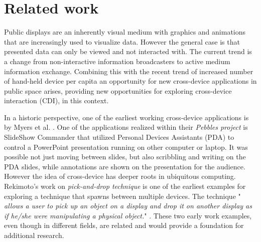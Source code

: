 \section{Related work} \label{sec:relatedwork}

Public displays are an inherently visual medium with graphics and animations that are increasingly used to visualize data. However the general case is that presented data can only be viewed and not interacted with. The current trend is a change from non-interactive information broadcasters to active medium information exchange. Combining this with the recent trend of increased number of hand-held device per capita an opportunity for new cross-device applications in public space arises, providing new opportunities for exploring cross-device interaction (CDI), in this context.

In a historic perspective, one of the earliest working cross-device applications is by Myers et al. \cite{Myers:2001}. 
One of the applications realized within their \emph{Pebbles project} is SlideShow Commander that utilized Personal Devices Assistants (PDA) to control a PowerPoint presentation running on other computer or laptop.
It was possible not just moving between slides, but also scribbling and writing on the PDA slides, while annotations are shown on the presentation for the audience. 
However the idea of cross-device has deeper roots in ubiquitous computing. Rekimoto's work on \emph{pick-and-drop technique} is one of the earliest examples for exploring a technique that spawns between multiple devices. The technique " \emph{allows a user to pick up an object on a display and drop it on another display as if he/she were manipulating a physical object.}" \cite{Rekimoto:1997}. 
These two early work examples, even though in different fields, are related and would provide a foundation for additional research.


